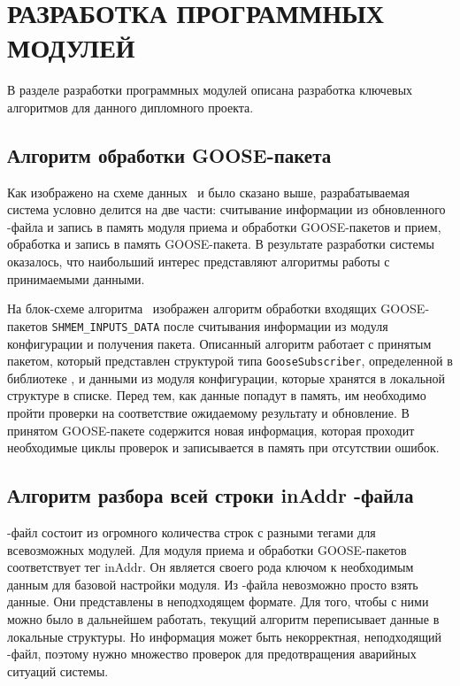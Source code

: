 \section{РАЗРАБОТКА ПРОГРАММНЫХ МОДУЛЕЙ}
\label{sec:dev}

В разделе разработки программных модулей
описана разработка ключевых алгоритмов для данного дипломного проекта.

\subsection{Алгоритм обработки GOOSE-пакета}

Как изображено на схеме данных \dataScheme\ и было сказано выше, разрабатываемая система условно делится на две части:
считывание информации из обновленного \cid-файла и запись в память модуля приема и обработки GOOSE-пакетов и
прием, обработка и запись в память GOOSE-пакета. В результате разработки системы оказалось, что наибольший интерес
представляют алгоритмы работы с принимаемыми данными.

На блок-схеме алгоритма \blockScheme\ изображен алгоритм обработки входящих GOOSE-пакетов \lstinline{SHMEM_INPUTS_DATA} после считывания
информации из модуля конфигурации и получения пакета. Описанный алгоритм работает с принятым пакетом, который представлен
структурой типа \lstinline{GooseSubscriber}, определенной в библиотеке \libIec, и данными из модуля конфигурации, которые
хранятся в локальной структуре в списке. Перед тем, как данные попадут в память, им необходимо пройти проверки на соответствие
ожидаемому результату и обновление. В принятом GOOSE-пакете содержится новая информация, которая проходит необходимые циклы проверок
и записывается в память при отсутствии ошибок.

\subsection{Алгоритм разбора всей строки inAddr \cid-файла}

\cid-файл состоит из огромного количества строк с разными тегами для всевозможных модулей. Для модуля приема и обработки GOOSE-пакетов соответствует тег
inAddr. Он является своего рода ключом к необходимым данным для базовой настройки модуля. Из \cid-файла невозможно просто взять данные. Они
представлены в неподходящем формате. Для того, чтобы с ними можно было в дальнейшем работать, текущий алгоритм переписывает данные в локальные структуры.
Но информация может быть некорректная, неподходящий \cid-файл, поэтому нужно множество проверок для предотвращения аварийных ситуаций системы.

